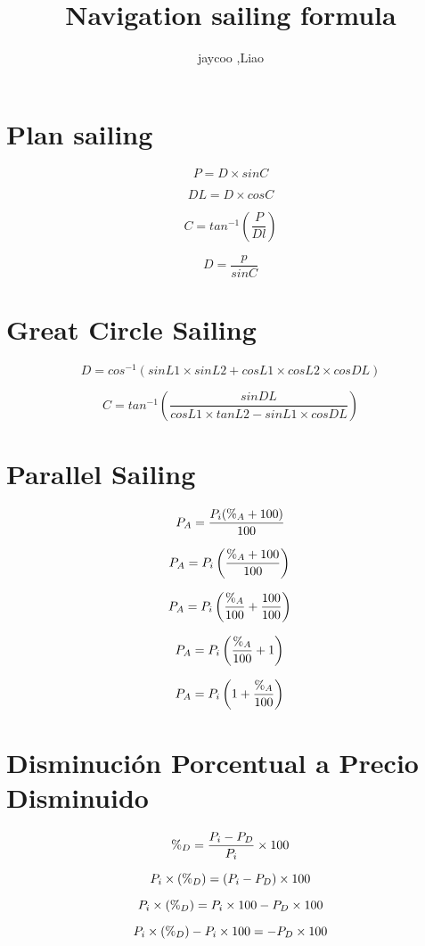 \documentclass[10pt]{article}         %
\title{Navigation sailing formula}
\author{jaycoo ,Liao}
\begin{document}
\maketitle

\section{Plan sailing}
$$
P=D\times{sinC}
$$

$$
DL=D\times{cosC}
$$

$$
C=tan^{-1}(\frac{P}{Dl})
$$

$$
D=\frac{p}{sinC}
$$
\section{Great Circle Sailing}
$$
D=cos^{-1}({sinL1}\times{sinL2}+{cosL1}\times{cosL2}\times{cosDL})
$$

$$
C=tan^{-1}(\frac{sinDL}{{cosL1}\times{tanL2}-{sinL1}\times{cosDL}})
$$
\section{Parallel Sailing}
$$
P_A=\frac{P_i(\%_A+100)}{100} \\
$$

$$
P_A=P_i\left (\frac{\%_A+100}{100}  \right ) \\
$$

$$
P_A=P_i\left (\frac{\%_A}{100}+\frac{100}{100}  \right ) \\
$$

$$
P_A=P_i\left (\frac{\%_A}{100}+1  \right ) \\
$$

$$
P_A=P_i\left (1+\frac{\%_A}{100}  \right ) \\
$$

\newpage

\section{Disminuci\'on Porcentual a Precio Disminuido}
$$
\%_D=\frac{P_i-P_D}{P_i}\times 100 \\
$$

$$
P_i\times(\%_D)=(P_i-P_D)\times 100 \\
$$

$$
P_i\times(\%_D)=P_i\times 100-P_D\times 100 \\
$$

$$
P_i\times(\%_D)-P_i\times 100=-P_D\times 100 \\
$$
\end{document}
